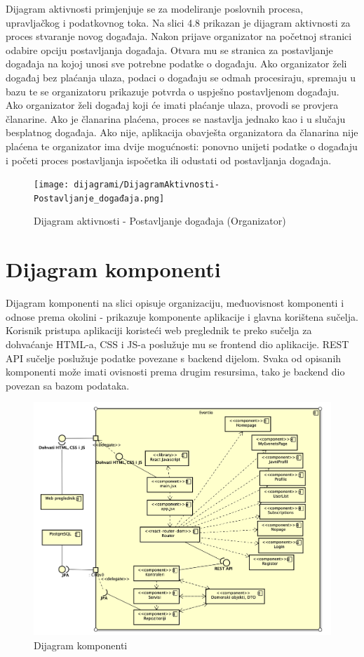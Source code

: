 			Dijagram aktivnosti primjenjuje se za modeliranje poslovnih procesa, upravljačkog i podatkovnog toka. Na slici 4.8 prikazan je dijagram aktivnosti za proces stvaranje novog događaja. Nakon prijave organizator na početnoj stranici odabire opciju postavljanja događaja. Otvara mu se stranica za postavljanje događaja na kojoj unosi sve potrebne podatke o događaju. Ako organizator želi događaj bez plaćanja ulaza, podaci o događaju se odmah procesiraju, spremaju u bazu te se organizatoru prikazuje potvrda o uspješno postavljenom događaju. Ako organizator želi događaj koji će imati plaćanje ulaza, provodi se provjera članarine. Ako je članarina plaćena, proces se nastavlja jednako kao i u slučaju besplatnog događaja. Ako nije, aplikacija obavješta organizatora da članarina nije plaćena te organizator ima dvije mogućnosti: ponovno unijeti podatke o događaju i početi proces postavljanja ispočetka ili odustati od postavljanja događaja.
			
			\begin{figure}[H]
				\texttt{[image: dijagrami/DijagramAktivnosti-Postavljanje\_događaja.png]}
				\centering
				\caption{Dijagram aktivnosti - Postavljanje događaja (Organizator)}
				\label{fig:promjene}
			\end{figure}
			
			\eject
		\section{Dijagram komponenti}
		
		Dijagram komponenti na slici opisuje organizaciju, međuovisnost komponenti i odnose prema okolini - prikazuje komponente aplikacije i glavna korištena sučelja. Korisnik pristupa aplikaciji koristeći web preglednik te preko sučelja za dohvaćanje HTML-a, CSS i JS-a poslužuje mu se frontend dio aplikacije.	REST API sučelje poslužuje podatke povezane s backend dijelom. Svaka od opisanih komponenti može imati ovisnosti prema drugim resursima, tako je backend dio povezan sa bazom podataka.
		
		\begin{figure}[H]
			\includegraphics[scale=0.48]{dijagrami/DijagramKomponenti.png}
			\centering
			\caption{Dijagram komponenti}
			\label{fig:promjene}
		\end{figure}